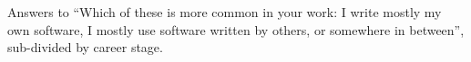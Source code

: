 \label{fig:write1}

Answers to ``Which of these is more common in your work: I write mostly my own software, I mostly use software written by others, or somewhere in between'', sub-divided by career stage.
  